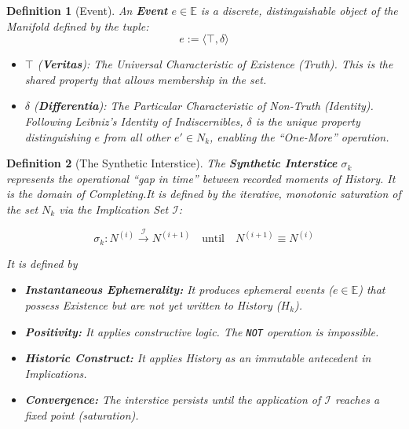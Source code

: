 \documentclass[11pt, a4paper]{article}
\theoremstyle{formalism}
\newtheorem{formalism}{Definition}
\begin{document}
\begin{formalism}[Event]
    An \textbf{Event} $e \in \mathbb{E}$ is a discrete, distinguishable object of the 
    Manifold defined by the tuple:
    \begin{equation}
        e := \langle \top, \delta \rangle
    \end{equation}
    \begin{itemize}
        \item $\top$ (\textbf{Veritas}): The \textit{Universal Characteristic} of 
        Existence (Truth). This is the shared property that allows membership in the set.
        \item $\delta$ (\textbf{Differentia}): The \textit{Particular Characteristic} of 
        Non-Truth (Identity). Following Leibniz's \textit{Identity of Indiscernibles}, 
        $\delta$ is the unique property distinguishing $e$ from all other $e' \in N_k$, 
        enabling the ``One-More'' operation.
    \end{itemize}
\end{formalism}

\begin{formalism}[The Synthetic Interstice]

    The \textbf{Synthetic Interstice} $\sigma_k$ represents the operational
    ``gap in time'' between recorded moments of History. It is the domain of
    \textit{Completing}.It is defined by the iterative, monotonic saturation of
    the set $N_k$ via the Implication Set $\mathcal{I}$:

    \begin{equation}
        \sigma_k : N^{(i)} \xrightarrow{\mathcal{I}} N^{(i+1)} \quad \text{until} \quad N^{(i+1)} \equiv N^{(i)}
    \end{equation}

    It is defined by
    \begin{itemize}

        \item \textbf{Instantaneous Ephemerality:} It produces ephemeral 
           events ($e \in \mathbb{E}$) that possess Existence but are not yet 
           written to History ($H_k$).

        \item \textbf{Positivity:} It applies constructive logic. The \texttt{NOT} 
           operation is impossible.

        \item \textbf{Historic Construct:} It applies History as an immutable 
           antecedent in Implications.

        \item \textbf{Convergence:} The interstice persists until the application 
           of $\mathcal{I}$ reaches a fixed point (saturation).
    \end{itemize}
\end{formalism}
\end{document}
